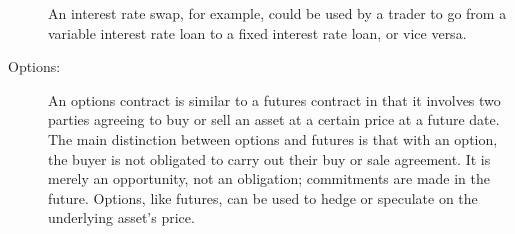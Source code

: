 \documentclass[a4 paper, 12pt]{report}
\theoremstyle{plain}
\begin{document}
\begin{description}
An interest rate swap, for example, could be used by a trader to go from a variable
interest rate loan to a fixed interest rate loan, or vice versa.
\item[Options: ] An options contract is similar to a futures contract in that it
involves two parties agreeing to buy or sell an asset at a certain price at a future date.
The main distinction between options and futures is that with an option, the buyer is not
obligated to carry out their buy or sale agreement. It is merely an opportunity, not an
obligation; commitments are made in the future. Options, like futures, can be used to
hedge or speculate on the underlying asset's price.
\end{description}
\end{document}
